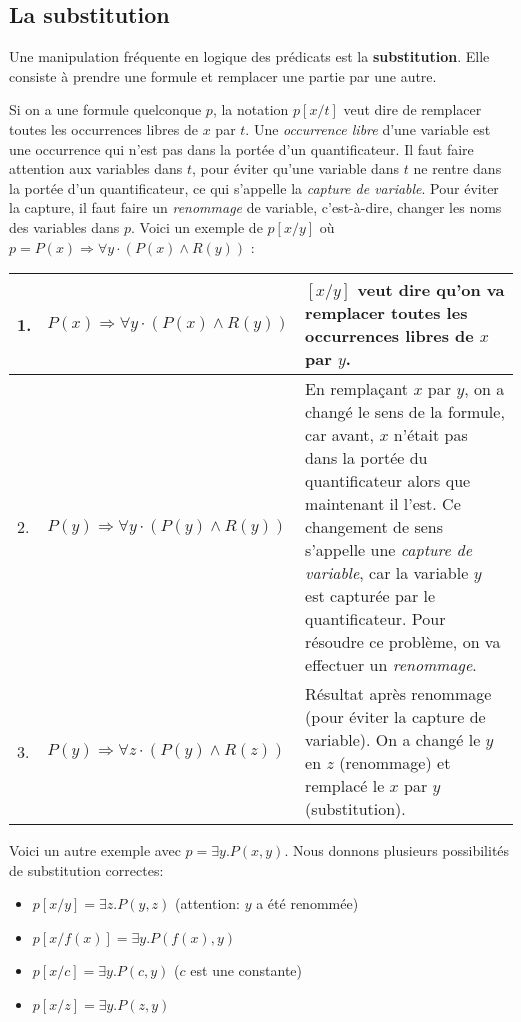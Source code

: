 \subsection{La substitution}
Une manipulation fréquente en logique des prédicats est la \textbf{substitution}. Elle consiste à prendre une formule et remplacer une partie par une autre.

Si on a une formule quelconque $p$, la notation $p[x/t]$ veut dire de remplacer toutes les occurrences libres de $x$ par $t$.
Une {\em occurrence libre} d'une variable est une occurrence qui n'est pas dans la portée d'un quantificateur.
Il faut faire attention aux variables dans $t$, pour éviter qu'une variable dans $t$ ne rentre dans la portée d'un quantificateur,
ce qui s'appelle la {\em capture de variable}.
Pour éviter la capture, il faut faire un {\em renommage} de variable, c'est-à-dire, changer les noms des variables dans $p$.
Voici un exemple de $p[x/y]$ où $p = P(x) \Rightarrow \forall y \cdot (P(x) \wedge R(y))$ :
\begin{center}
\begin{tabular}{|l |l |>{\raggedright}m{6cm}|}
\hline
1. &$P(x) \Rightarrow \forall y \cdot (P(x) \wedge R(y))$&$[x/y]$ veut dire qu'on va remplacer toutes les occurrences libres de $x$ par $y$.\tabularnewline
\hline
2. &$P(y) \Rightarrow \forall y \cdot (P(y) \wedge R(y))$&En remplaçant $x$ par $y$, on a changé le sens de la formule, car avant, $x$ n'était pas dans la portée du quantificateur alors que maintenant il l'est. Ce changement de sens s'appelle une \textit{capture de variable}, car la variable $y$ est capturée par le quantificateur. Pour résoudre ce problème, on va effectuer un \textit{renommage}.\tabularnewline
\hline
3. &$P(y) \Rightarrow \forall z \cdot (P(y) \wedge R(z))$&Résultat après renommage (pour éviter la capture de variable).
On a changé le $y$ en $z$ (renommage) et remplacé le $x$ par $y$ (substitution). \tabularnewline
\hline
\end{tabular}
\end{center}

Voici un autre exemple avec $p = \exists y . P(x,y)$.
Nous donnons plusieurs possibilités de substitution correctes:
\begin{itemize}
\item $p[x/y] = \exists z. P(y,z)$ (attention: $y$ a été renommée)
\item $p[x/f(x)] = \exists y. P(f(x),y)$
\item $p[x/c] = \exists y. P(c,y)$ ($c$ est une constante)
\item $p[x/z] = \exists y. P(z,y)$
\end{itemize}

